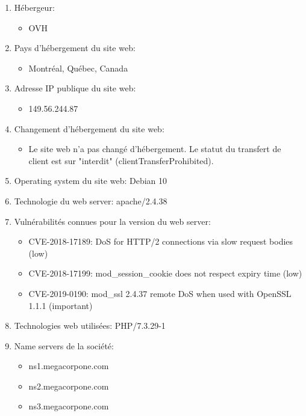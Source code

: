 \documentclass[french,oneside]{article}
\begin{document}
\begin{enumerate}
    \item Hébergeur:
    \begin{itemize}
        \item OVH
    \end{itemize}
    \item Pays d'hébergement du site web:
    \begin{itemize}
        \item Montréal, Québec, Canada
    \end{itemize}
    \item Adresse IP publique du site web:
    \begin{itemize}
        \item 149.56.244.87
    \end{itemize}
    \item Changement d'hébergement du site web:
    \begin{itemize}
        \item Le site web n'a pas changé d'hébergement. Le statut du transfert de client est sur "interdit" (clientTransferProhibited).
    \end{itemize}
    \item Operating system du site web: Debian 10
    \item Technologie du web server: apache/2.4.38
    \item Vulnérabilités connues pour la version du web server:
    \begin{itemize}
        \item CVE-2018-17189: DoS for HTTP/2 connections via slow request bodies (low)
        \item CVE-2018-17199: mod\_session\_cookie does not respect expiry time (low)
        \item CVE-2019-0190: mod\_ssl 2.4.37 remote DoS when used with OpenSSL 1.1.1 (important)
    \end{itemize}
    \item Technologies web utilisées: PHP/7.3.29-1
    \item Name servers de la société:
    \begin{itemize}
        \item ns1.megacorpone.com
        \item ns2.megacorpone.com
        \item ns3.megacorpone.com
    \end{itemize}
\end{enumerate}
\end{document}
